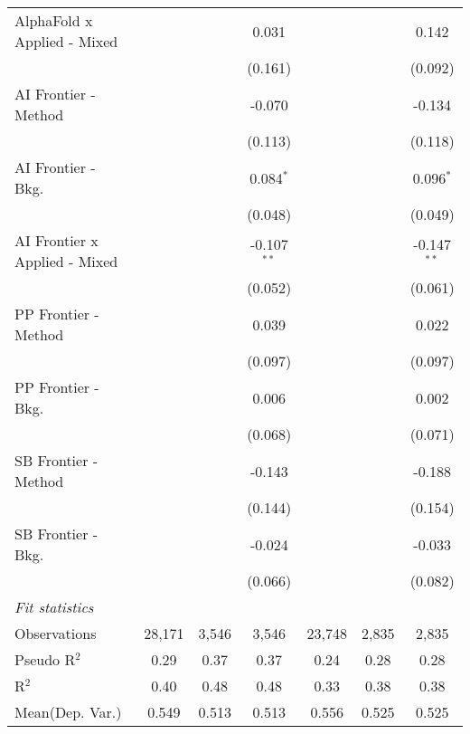 \begin{tabular}{lcccccc}
   AlphaFold x Applied - Mixed   &              &             & 0.031         &                &              & 0.142\\   
                                 &              &             & (0.161)       &                &              & (0.092)\\   
   AI Frontier - Method          &              &             & -0.070        &                &              & -0.134\\   
                                 &              &             & (0.113)       &                &              & (0.118)\\   
   AI Frontier - Bkg.            &              &             & 0.084$^{*}$   &                &              & 0.096$^{*}$\\   
                                 &              &             & (0.048)       &                &              & (0.049)\\   
   AI Frontier x Applied - Mixed &              &             & -0.107$^{**}$ &                &              & -0.147$^{**}$\\   
                                 &              &             & (0.052)       &                &              & (0.061)\\   
   PP Frontier - Method          &              &             & 0.039         &                &              & 0.022\\   
                                 &              &             & (0.097)       &                &              & (0.097)\\   
   PP Frontier - Bkg.            &              &             & 0.006         &                &              & 0.002\\   
                                 &              &             & (0.068)       &                &              & (0.071)\\   
   SB Frontier - Method          &              &             & -0.143        &                &              & -0.188\\   
                                 &              &             & (0.144)       &                &              & (0.154)\\   
   SB Frontier - Bkg.            &              &             & -0.024        &                &              & -0.033\\   
                                 &              &             & (0.066)       &                &              & (0.082)\\   
   \midrule
   \emph{Fit statistics}\\
   Observations                  & 28,171       & 3,546       & 3,546         & 23,748         & 2,835        & 2,835\\  
   Pseudo R$^2$                  & 0.29         & 0.37        & 0.37          & 0.24           & 0.28         & 0.28\\  
   R$^2$                         & 0.40         & 0.48        & 0.48          & 0.33           & 0.38         & 0.38\\  
Mean(Dep. Var.) & 0.549 & 0.513 & 0.513 & 0.556 & 0.525 & 0.525 \\
   

\end{tabular}
